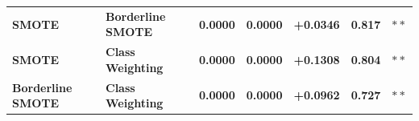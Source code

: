\begin{table}[ht]
\begin{tabular}{llrrrrl}
    \textbf{SMOTE} & \textbf{Borderline SMOTE} & \textbf{0.0000} & \textbf{0.0000} & \textbf{+0.0346} & \textbf{0.817} & $\ast\ast$ \\
    \textbf{SMOTE} & \textbf{Class Weighting} & \textbf{0.0000} & \textbf{0.0000} & \textbf{+0.1308} & \textbf{0.804} & $\ast\ast$ \\
    \textbf{Borderline SMOTE} & \textbf{Class Weighting} & \textbf{0.0000} & \textbf{0.0000} & \textbf{+0.0962} & \textbf{0.727} & $\ast\ast$ \\
\bottomrule
\end{tabular}
\end{table}